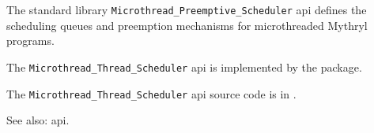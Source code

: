 
The standard library {\tt Microthread\_Preemptive\_Scheduler} api defines the scheduling queues and preemption mechanisms for microthreaded Mythryl programs.

The {\tt Microthread\_Thread\_Scheduler} api is implemented by the  package.

The {\tt Microthread\_Thread\_Scheduler} api source code is in .

See also:  api.

